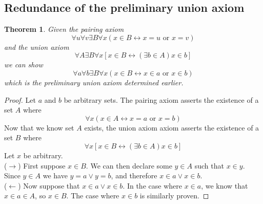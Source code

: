 \documentclass{report}
\newtheorem{theorem}[theo]{Theorem}
\begin{document}
\subsection{Redundance of the preliminary union axiom}
\begin{theorem}
Given the pairing axiom
\begin{equation*}
\forall u\forall v\exists B\forall x(x\in B\leftrightarrow x=u\text{ or }x=v)
\end{equation*}
and the union axiom
\begin{equation*}
\forall A\exists B\forall x[x\in B\leftrightarrow(\exists b\in A) x\in b]
\end{equation*}
we can show
\begin{equation*}
\forall a\forall b\exists B\forall x(x\in B\leftrightarrow x\in a\text{ or }x\in b)
\end{equation*}
which is the preliminary union axiom determined earlier.
\end{theorem}
\begin{proof}
Let $a$ and $b$ be arbitrary sets. The pairing axiom asserts the existence of a set $A$ where
\begin{equation*}
\forall x(x\in A\leftrightarrow x=a\text{ or }x=b)
\end{equation*}
Now that we know set $A$ exists, the union axiom axiom asserts the existence of a set $B$ where
\begin{equation*}
\forall x[x\in B\leftrightarrow(\exists b\in A) x\in b]
\end{equation*}
Let $x$ be arbitrary.\\
\indent($\rightarrow$) First suppose $x\in B$. We can then declare some $y\in A$ such that $x\in y$. Since $y\in A$ we have $y=a\lor y=b$, and therefore $x\in a\lor x\in b$.\\
\indent($\leftarrow$) Now suppose that $x\in a\lor x\in b$. In the case where $x\in a$, we know that $x\in a\in A$, so $x\in B$. The case where $x\in b$ is similarly proven.
\end{proof}
\newpage
\end{document}
